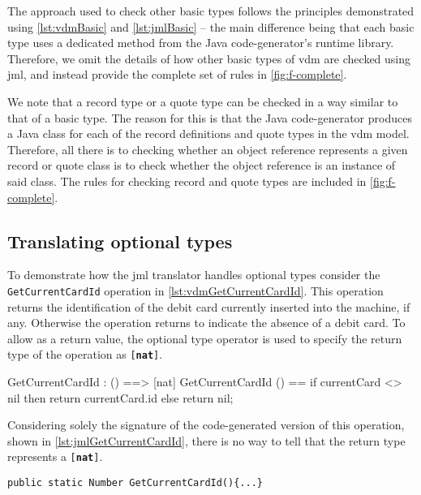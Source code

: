 The approach used to check other basic types follows the principles
demonstrated using \autoref{lst:vdmBasic} and \autoref{lst:jmlBasic}
-- the main difference being that each basic type uses a dedicated
method from the Java code-generator's runtime library. Therefore, we
omit the details of how other basic types of \ac{vdm} are checked
using \ac{jml}, and instead provide the complete set of rules in
\autoref{fig:f-complete}.

We note that a record type or a quote type can be checked in a way
similar to that of a basic type. The reason for this is that the Java
code-generator produces a Java class for each of the record definitions and
quote types in the \ac{vdm} model. Therefore, all there is to checking
whether an object reference represents a given record or quote class
is to check whether the object reference is an instance of said
class. The rules for checking record and quote types are included in
\autoref{fig:f-complete}.

\subsection{Translating optional types}
\label{sec:optional}

To demonstrate how the \ac{jml} translator handles optional types
consider the \texttt{GetCurrentCardId} operation in
\autoref{lst:vdmGetCurrentCardId}. This operation returns the
identification of the debit card currently inserted into the machine,
if any. Otherwise the operation returns  to indicate the
absence of a debit card. To allow  as a return value, the
optional type operator is used to specify the return type of the
operation as \texttt{[\textbf{nat}]}.

\begin{vdmsl}[style=customVdm,caption={Operation for getting the id of
the debit card currently inserted into the
\ac{atm}.},label={lst:vdmGetCurrentCardId}]
GetCurrentCardId : () ==> [nat]
GetCurrentCardId () ==
 if currentCard <> nil then
   return currentCard.id
 else
   return nil;
\end{vdmsl}

Considering solely the signature of the code-generated version of this
operation, shown in \autoref{lst:jmlGetCurrentCardId}, there is no way
to tell that the return type represents a \texttt{[\textbf{nat}]}.

\begin{lstlisting}[style=customJml,caption={Signature of the
code-generated version of the \texttt{GetCurrentCardId}
operation.},label={lst:jmlGetCurrentCardId}]
public static Number GetCurrentCardId(){...}
\end{lstlisting}

